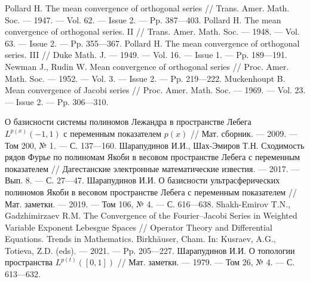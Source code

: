 \begin{thebibliography}{111}

  
 Pollard H. The mean convergence of orthogonal series // Trans. Amer. Math. Soc.
--- 1947. --- Vol. 62. --- Issue 2. --- Pp. 387---403.
 Pollard H. The mean convergence of orthogonal series. II // Trans. Amer. Math. Soc.
--- 1948. --- Vol. 63. --- Issue 2. --- Pp. 355---367.
 Pollard H. The mean convergence of orthogonal series. III // Duke Math. J. --- 1949.
--- Vol. 16. --- Issue 1. --- Pp. 189---191.
 Newman J., Rudin W. Mean convergence of orthogonal series // Proc. Amer. Math.
Soc. --- 1952. --- Vol. 3. --- Issue 2. --- Pp. 219---222.
Muckenhoupt B. Mean convergence of Jacobi series // Proc. Amer. Math. Soc. --- 1969.
--- Vol. 23. --- Issue 2. --- Pp. 306---310.

 О базисности системы полиномов Лежандра в пространстве Лебега $L^{p(x)}(-1,1)$ с переменным показателем $p(x)$ // Мат. сборник. --- 2009. --- Том 200, № 1. --- С. 137---160.
Шарапудинов И.И., Шах-Эмиров Т.Н. Сходимость рядов Фурье по полиномам Якоби в весовом пространстве Лебега с переменным показателем // Дагестанские электронные математические известия. --- 2017. --- Вып. 8. --- С. 27---47.
Шарапудинов И.И. О базисности ультрасферических полиномов Якоби в весовом пространстве Лебега с переменным показателем // Мат. заметки. --- 2019. --- Том 106, № 4. --- С. 616---638.
 Shakh-Emirov T.N., Gadzhimirzaev R.M.  The Convergence of the Fourier–Jacobi Series in Weighted Variable Exponent Lebesgue Spaces // Operator Theory and Differential Equations. Trends in Mathematics. Birkhäuser, Cham.  In: Kusraev, A.G., Totieva, Z.D. (eds). --- 2021. --- Pp. 205---227.
 Шарапудинов И.И. О топологии пространства $L^{p(t)}([0,1])$ // Мат. заметки. --- 1979. --- Том 26, № 4. --- С. 613---632.

 

\end{thebibliography}
